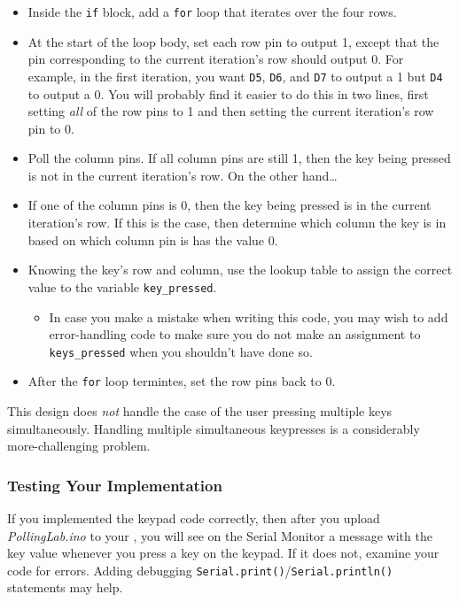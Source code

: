     \begin{itemize}
    \item Inside the \lstinline{if} block, add a \lstinline{for} loop that
        iterates over the four rows.
    \item At the start of the loop body, set each row pin to output 1, except
        that the pin corresponding to the current iteration's row should output
        0. For example, in the first iteration, you want \texttt{D5},
        \texttt{D6}, and \texttt{D7} to output a 1 but \texttt{D4} to output a
        0. You will probably find it easier to do this in two lines, first
        setting \textit{all} of the row pins to 1 and then setting the current
        iteration's row pin to 0.
    \item Poll the column pins. If all column pins are still 1, then the key
        being pressed is not in the current iteration's row. On the other
        hand\dots
    \item If one of the column pins is 0, then the key being pressed is in the
        current iteration's row. If this is the case, then determine which
        column the key is in based on which column pin is has the value 0.
    \item Knowing the key's row and column, use the lookup table to assign the correct value to the variable \lstinline{key_pressed}.
        \begin{itemize}
        \item In case you make a mistake when writing this code, you may wish
            to add error-handling code to make sure you do not make an
            assignment to \lstinline{keys_pressed} when you shouldn't have done
            so.
        \end{itemize}
    \item After the \lstinline{for} loop termintes, set the row pins back to 0.
    \end{itemize}

This design does \textit{not} handle the case of the user pressing multiple
keys simultaneously. Handling multiple simultaneous keypresses is a
considerably more-challenging problem.

\subsubsection{Testing Your Implementation}

If you implemented the keypad code correctly, then after you upload
\textit{PollingLab.ino} to your \nano, you will see on the Serial Monitor a
message with the key value whenever you press a key on the keypad. If it does
not, examine your code for errors. Adding debugging
\lstinline{Serial.print()}/\lstinline{Serial.println()} statements may help.

